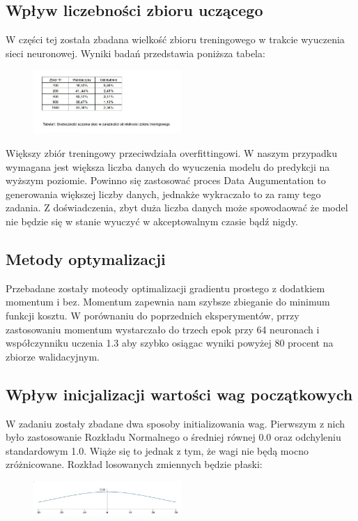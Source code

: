 \documentclass{article}
\begin{document}
	\subsection{Wpływ liczebności zbioru uczącego}
	W części tej została zbadana wielkość zbioru treningowego w trakcie wyuczenia sieci neuronowej. Wyniki badań przedstawia poniższa tabela:
	
	\begin{figure}[h]
		\centering
		\caption{}
		\includegraphics[width=0.5\textwidth]{tabela_zbior.jpg}
	\end{figure}	 
	Większy zbiór treningowy przeciwdziała overfittingowi. W naszym przypadku wymagana jest większa liczba danych do wyuczenia modelu do predykcji na wyższym poziomie. Powinno się zastosować proces Data Augumentation to generowania większej liczby danych, jednakże wykraczało to za ramy tego zadania. Z doświadczenia, zbyt duża liczba danych może spowodaować że model nie będzie się w stanie wyuczyć w akceptowalnym czasie bądź nigdy.
	
	\subsection{Metody optymalizacji}
	Przebadane zostały moteody optimalizacji gradientu prostego z dodatkiem momentum i bez. Momentum zapewnia nam szybsze zbieganie do minimum funkcji kosztu. W porównaniu do poprzednich eksperymentów, prrzy zastosowaniu momentum wystarczało do trzech epok przy 64 neuronach i współczynniku uczenia 1.3 aby szybko osiągac wyniki powyżej 80 procent na zbiorze walidacyjnym.
	   \newpage
	\subsection{Wpływ inicjalizacji wartości wag początkowych}
	W zadaniu zostały zbadane dwa sposoby initializowania wag. Pierwszym z nich było zastosowanie Rozkładu Normalnego o średniej równej 0.0 oraz odchyleniu standardowym 1.0. Wiąże się to jednak z tym, że wagi nie będą mocno zróżnicowane. Rozkład losowanych zmiennych będzie płaski:
	
	\begin{figure}[h]
		\centering
		\caption{}
		\includegraphics[width=0.5\textwidth]{gauss1.jpg}
	\end{figure}
	
\end{document}
